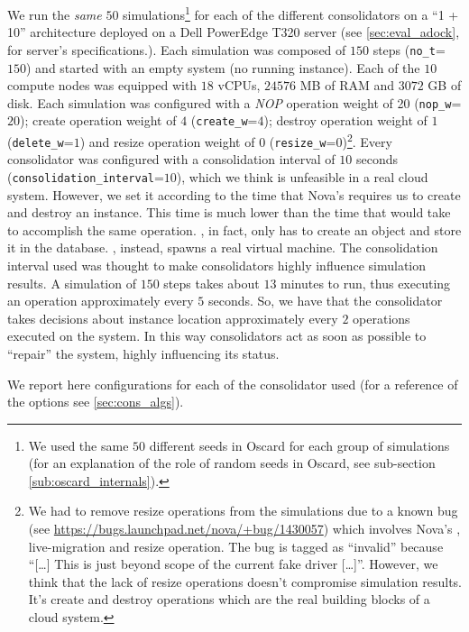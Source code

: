 We run the \emph{same} $50$ simulations\footnote{We used the same $50$ different seeds in Oscard for each group of simulations (for an explanation of the role of random seeds in Oscard, see sub-section \ref{sub:oscard_internals}).} for each of the different consolidators on a ``1 + 10'' architecture deployed on a Dell PowerEdge T320 server (see \ref{sec:eval_adock}, for server's specifications.). Each simulation was composed of $150$ steps (\texttt{no\_t}=$150$) and started with an empty system (no running instance). Each of the $10$ compute nodes was equipped with $18$ vCPUs, $24576$ MB of RAM and $3072$ GB of disk.
Each simulation was configured with a \textit{NOP} operation weight of 20 (\texttt{nop\_w}=$20$); create operation weight of $4$ (\texttt{create\_w}=$4$); destroy operation weight of $1$ (\texttt{delete\_w}=$1$) and resize operation weight of $0$ (\texttt{resize\_w}=$0$)\footnote{We had to remove resize operations from the simulations due to a known bug (see \url{https://bugs.launchpad.net/nova/+bug/1430057}) which involves Nova's , live-migration and resize operation. The bug is tagged as ``invalid'' because ``[\ldots] This is just beyond scope of the current fake driver [\ldots]''. However, we think that the lack of resize operations doesn't compromise simulation results. It's create and destroy operations which are the real building blocks of a cloud system.}. Every consolidator was configured with a consolidation interval of $10$ seconds (\texttt{consolidation\_interval}=$10$), which we think is unfeasible in a real cloud system. However, we set it according to the time that Nova's  requires us to create and destroy an instance. This time is much lower than the time that would take  to accomplish the same operation. , in fact, only has to create an object and store it in the database. , instead, spawns a real virtual machine. The consolidation interval used was thought to make consolidators highly influence simulation results. A simulation of $150$ steps takes about $13$ minutes to run, thus executing an operation approximately every $5$ seconds. So, we have that the consolidator takes decisions about instance location approximately every $2$ operations executed on the system. In this way consolidators act as soon as possible to ``repair'' the system, highly influencing its status.

We report here configurations for each of the consolidator used (for a reference of the options see \ref{sec:cons_algs}).

